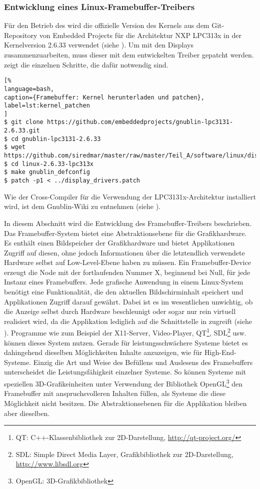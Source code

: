 \subsubsection{Entwicklung eines Linux-Framebuffer-Treibers}
Für den Betrieb des  wird die offizielle Version des Kernels aus dem Git-Repository von Embedded Projects für die Architektur NXP LPC313x in der Kernelversion 2.6.33 verwendet (siehe \cite{GnublinWiki2013b}). Um mit den Displays zusammenzuarbeiten, muss dieser mit dem entwickelten Treiber gepatcht werden.  zeigt die einzelnen Schritte, die dafür notwendig sind.

\begin{lstlisting}[%
language=bash,
caption={Framebuffer: Kernel herunterladen und patchen},
label=lst:kernel_patchen
]
$ git clone https://github.com/embeddedprojects/gnublin-lpc3131-2.6.33.git
$ cd gnublin-lpc3131-2.6.33
$ wget https://github.com/siredmar/master/raw/master/Teil_A/software/linux/display_drivers.patch
$ cd linux-2.6.33-lpc313x
$ make gnublin_defconfig
$ patch -p1 < ../display_drivers.patch
\end{lstlisting}
Wie der Cross-Compiler für die Verwendung der LPC3131x-Architektur installiert wird, ist dem Gnublin-Wiki zu entnehmen (siehe \cite{GnublinWiki2013c}).

In diesem Abschnitt wird die Entwicklung des Framebuffer-Treibers beschrieben. Das Framebuffer-System bietet eine Abstraktionsebene für die Grafikhardware. Es enthält einen Bildspeicher der Grafikhardware und bietet Applikationen Zugriff auf diesen, ohne jedoch Informationen über die letztendlich verwendete Hardware selbst auf Low-Level-Ebene haben zu müssen. Ein Framebuffer-Device erzeugt die Node  mit der fortlaufenden Nummer X, beginnend bei Null, für jede Instanz eines Framebuffers. Jede grafische Anwendung in einem Linux-System benötigt eine Funktionalität, die den aktuellen Bildschirminhalt speichert und Applikationen Zugriff darauf gewährt. Dabei ist es im wesentlichen unwichtig, ob die Anzeige selbst durch Hardware beschleunigt oder sogar nur rein virtuell realisiert wird, da die Applikation lediglich auf die Schnittstelle in  zugreift (siehe  \cite{LinuxKernelFB}).
Programme wie zum Beispiel der X11-Server, Video-Player, QT\footnote{QT: C++-Klassenbibliothek zur 2D-Darstellung, \url{http://qt-project.org/}}, SDL\footnote{SDL: Simple Direct Media Layer, Grafikbibliothek zur 2D-Darstellung, \url{http://www.libsdl.org}} usw. können dieses System nutzen. Gerade für leistungsschwächere Systeme bietet es dahingehend dieselben Möglichkeiten Inhalte anzuzeigen, wie für High-End-Systeme. Einzig die Art und Weise des Befüllens und Auslesens des Framebuffers unterscheidet die Leistungsfähigkeit einzelner Systeme. So können Systeme mit speziellen 3D-Grafikeinheiten unter Verwendung der Bibliothek OpenGL\footnote{OpenGL: 3D-Grafikbibliothek} den Framebuffer mit anspruchsvolleren Inhalten füllen, als Systeme die diese Möglichkeit nicht besitzen. Die Abstraktionsebenen für die Applikation bleiben aber dieselben. 

